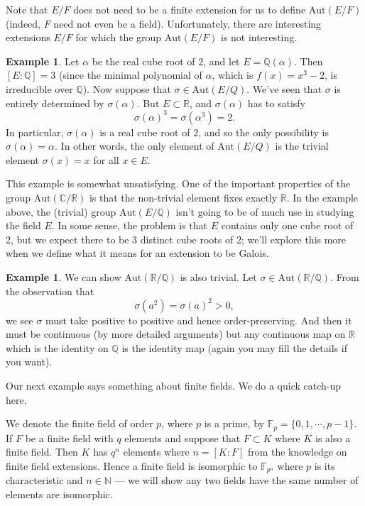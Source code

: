 \documentclass[12pt]{report}
\theoremstyle{definition}
\newtheorem{example}[thm]{Example}
\def\NN{\mathbb{N}}
\def\CC{\mathbb{C}}
\def\QQ{\mathbb{Q}}
\def\RR{\mathbb{R}}
\def\FF{\mathbb{F}}
\def\Aut{\mbox{Aut}}
\def\aa{\alpha}
\begin{document}
Note that $E/F$ does not need to be a finite extension for us to define $\Aut(E/F)$ (indeed, $F$ need not even be a field).
Unfortunately, there are interesting extensions $E/F$ for which the group $\Aut(E/F)$ is not interesting.

\begin{example}
    Let $\aa$ be the real cube root of $2$, and let $E = \QQ(\aa)$. Then $[E:\QQ] = 3$ (since the minimal polynomial of $\aa$, which is $f(x) = x^3 - 2$, is irreducible over $\QQ$). Now suppose that $\sigma \in \Aut(E/Q)$. We've seen that $\sigma$ is entirely determined by $\sigma(\aa)$. But $E \subset \RR$, and $\sigma(\aa)$ has to satisfy $$\sigma(\aa)^3 = \sigma(\aa^3) = 2.$$
    In particular, $\sigma(\aa)$ is a real cube root of $2$, and so the only possibility is $\sigma(\aa) = \aa$. In other words, the only element of $\Aut(E/Q)$ is the trivial element $\sigma(x) = x$ for all $x \in E$.
\end{example}

This example is somewhat unsatisfying. One of the important properties of the group $\Aut(\CC/\RR)$ is that the non-trivial element fixes exactly $\RR$. In the example above, the (trivial) group $\Aut(E/\QQ)$ isn't going to be of much use in studying the field $E$. In some sense, the problem is that $E$ contains only one cube root of 2, but we expect there to be 3 distinct cube roots of 2; we'll explore this more when we define what it means for an extension to be Galois.

\begin{example}
    We can show $\Aut(\RR/\QQ)$ is also trivial. Let $\sigma\in \Aut(\RR/\QQ)$. From the observation that $$\sigma(a^2)=\sigma(a)^2 > 0,$$ we see $\sigma$ must take positive to positive and hence order-preserving. And then it must be continuous (by more detailed arguments) but any continuous map on $\RR$ which is the identity on $\QQ$ is the identity map (again you may fill the details if you want).
\end{example}

\noindent Our next example says something about finite fields. We do a quick catch-up here.


We denote the finite field of order $p$, where $p$ is a prime, by $\FF_p=\{0,1,\cdots,p-1\}$. If $F$ be a finite field with $q$ elements and suppose that $F \subset K$ where $K$ is also a finite field. Then $K$ has $q^n$ elements where $n = [K:F]$ from the knowledge on finite field extensions. Hence a finite field is isomorphic to $\FF_{p^n}$ where $p$ is its characteristic and $n\in \NN$ --- we will show any two fields have the same number of elements are isomorphic.
\end{document}
